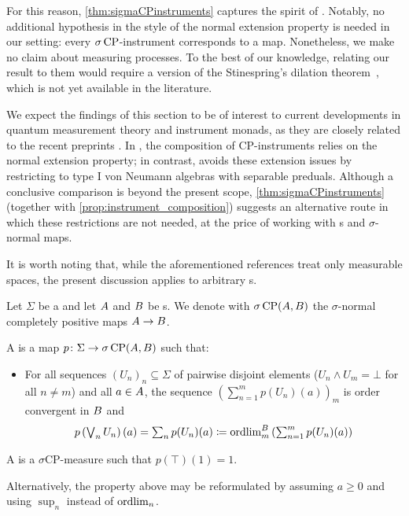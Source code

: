 For this reason, \cref{thm:sigmaCPinstruments} captures the spirit of
\cite[Theorem 3.4]{okamura2015measurement}.
Notably, no additional hypothesis in the style of the normal extension
property is needed in our setting: every $\sigma\operatorname{CP}$-instrument
corresponds to a \scpu{} map.
Nonetheless, we make no claim about measuring processes. To the best
of our knowledge, relating our result to them would require a \cstars{}
version of the Stinespring's dilation theorem~\cite[Theorem 4.1]{paulsen2002}, which is not yet
available in the literature.

We expect the findings of this section to be of interest to current
developments in quantum measurement theory and instrument monads, as
they are closely related to the recent preprints
\cite{booth2026quantuminstruments,fritz2026quantuminstrumentmonad}.
In \cite{booth2026quantuminstruments}, the composition of CP-instruments relies on the normal extension property; in contrast,
\cite{fritz2026quantuminstrumentmonad} avoids these extension issues by
restricting to type I von Neumann algebras with separable preduals.
Although a conclusive comparison is beyond the present scope,
\cref{thm:sigmaCPinstruments} (together with
\cref{prop:instrument_composition}) suggests an alternative route in
which these restrictions are not needed, at the price of working with
\cstars{}s and $\sigma$-normal maps.

It is worth noting that, while the aforementioned references treat only measurable spaces, the present discussion applies to arbitrary \bsigma{}s.

\begin{definition}
	Let $\Sigma$ be a \bsigma{} and let ${A} $ and ${B}$ be \cstars{}s. We denote with $\sigma\operatorname{CP}({A},{B})$ the $\sigma$-normal completely positive maps ${A} \to {B}$.

	A  is a map $p\colon \Sigma \to \sigma\operatorname{CP}({A},{B})$ such that:
	\begin{itemize}
		\item For all sequences $(U_n)_n\subseteq \Sigma$ of pairwise disjoint elements ($U_{n}\wedge U_{m}=\bot$ for all $n\neq m$) and all $a\in {A}$, the sequence $(\sum_{n=1}^m p(U_n)(a))_m$ is order convergent in ${B}$ and
		      \[\textstyle
			      p\left(\bigvee_n U_n\right)(a) = \sum_n p(U_n)(a)\coloneqq \operatorname{ordlim}_m^{{B}} \left(\sum_{n=1}^m p(U_n)(a)\right)
		      \]
	\end{itemize}
	A  is a {$\sigma$CP-measure} such that $p(\top)(1)=1$.
\end{definition}
Alternatively, the property above may be reformulated by assuming $a\ge 0$ and using $\sup_n$ instead of $\operatorname{ordlim}_n$.

